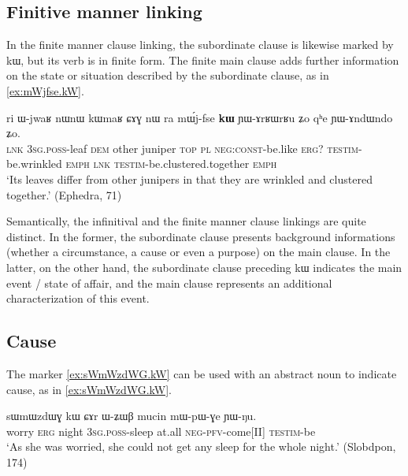 \documentclass[oldfontcommands,oneside,a4paper,11pt]{article}
\newcommand{\ipa}[1]{{\phon #1}} %
\begin{document}
\subsection{Finitive manner linking}
In the finite manner clause linking, the subordinate clause is likewise marked by \ipa{kɯ}, but its verb is in finite form. The  finite  main clause adds further information on the state or situation described by the subordinate clause, as in \ref{ex:mWjfse.kW}. 
 

 \begin{exe}
\ex \label{ex:mWjfse.kW}
\gll
\ipa{ri} 	\ipa{ɯ-jwaʁ} 	\ipa{nɯnɯ} 	\ipa{kɯmaʁ} 	\ipa{ɕɤɣ} 	\ipa{nɯ} \ipa{ra} 	\ipa{mɯ́j-fse} 	\ipa{\textbf{kɯ}} 	\ipa{ɲɯ-ɤrʁɯrʁu} 	\ipa{ʑo} 	\ipa{qʰe} 	\ipa{ɲɯ-ɤndɯndo} 	\ipa{ʑo.} \\
\textsc{lnk} \textsc{3sg.poss}-leaf \textsc{dem} other juniper \textsc{top} \textsc{pl} \textsc{neg:const}-be.like \textsc{erg?} \textsc{testim}-be.wrinkled \textsc{emph} \textsc{lnk}  \textsc{testim}-be.clustered.together \textsc{emph} \\
\glt `Its leaves differ from other junipers in that they are wrinkled and clustered together.' (Ephedra, 71)
 \end{exe}
 
Semantically,  the infinitival and the finite manner clause linkings are quite distinct. In the former, the subordinate clause presents background informations (whether a circumstance, a cause or even a purpose) on the main clause. In the latter, on the other hand, the subordinate clause preceding \ipa{kɯ} indicates the main event / state of affair, and the main clause represents an additional characterization of this event.


\subsection{Cause} \label{sec:cause}

The marker \ref{ex:sWmWzdWG.kW} can be used with an abstract noun to indicate cause, as in \ref{ex:sWmWzdWG.kW}.

\begin{exe}
\ex \label{ex:sWmWzdWG.kW}
\gll 
\ipa{sɯmɯzdɯɣ}  	\ipa{kɯ}  	\ipa{ɕɤr}  	\ipa{ɯ-ʑɯβ}  	\ipa{mucin}  	\ipa{mɯ-pɯ-ɣe}  	\ipa{ɲɯ-ŋu.}  	 \\
worry \textsc{erg} night \textsc{3sg.poss}-sleep at.all \textsc{neg-pfv}-come[II] \textsc{testim}-be \\
\glt `As she was worried, she could not get any sleep for the whole night.' (Slobdpon, 174)
\end{exe}
\end{document}
